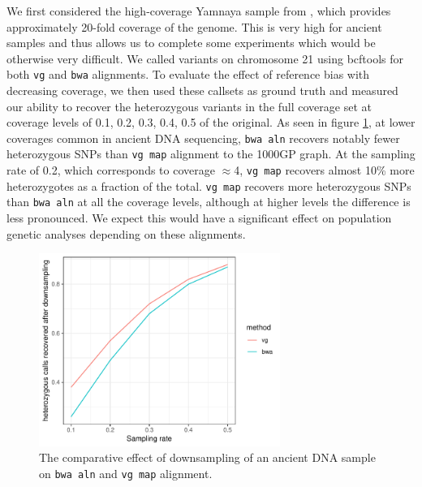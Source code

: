 We first considered the high-coverage Yamnaya sample from \cite{de2018first}, which provides approximately 20-fold coverage of the genome.
This is very high for ancient samples and thus allows us to complete some experiments which would be otherwise very difficult.
We called variants on chromosome 21 using bcftools \cite{li2009sequence} for both {\tt vg} and {\tt bwa} alignments.
To evaluate the effect of reference bias with decreasing coverage, we then used these callsets as ground truth and measured our ability to recover the heterozygous variants in the full coverage set at coverage levels of 0.1, 0.2, 0.3, 0.4, 0.5 of the original.
As seen in figure \ref{fig:aDNA_downsampling}, at lower coverages common in ancient DNA sequencing, {\tt bwa aln} recovers notably fewer heterozygous SNPs than {\tt vg map} alignment to the 1000GP graph.
At the sampling rate of 0.2, which corresponds to coverage $\approx$4, {\tt vg map} recovers almost 10\% more heterozygotes as a fraction of the total.
{\tt vg map} recovers more heterozygous SNPs than {\tt bwa aln} at all the coverage levels, although at higher levels the difference is less pronounced.
We expect this would have a significant effect on population genetic analyses depending on these alignments.

\begin{figure}[htbp!]
  \centering
  \includegraphics[width=0.7\textwidth]{Chapter3/Figs/aDNA_downsampling.pdf}
  \caption[Downsampling a high-coverage aDNA sample]{
    The comparative effect of downsampling of an ancient DNA sample on {\tt bwa aln} and {\tt vg map} alignment.
  }
  \label{fig:aDNA_downsampling}
\end{figure}

